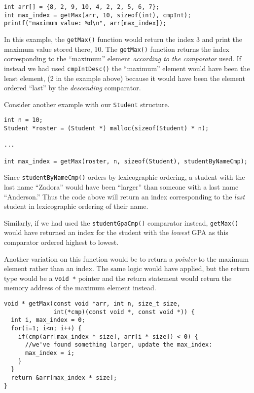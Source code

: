 \begin{verbatim}
int arr[] = {8, 2, 9, 10, 4, 2, 2, 5, 6, 7};
int max_index = getMax(arr, 10, sizeof(int), cmpInt);
printf("maximum value: %d\n", arr[max_index]);
\end{verbatim}

In this example, the \texttt{getMax()} function would return
the index 3 and print the maximum value stored there, 10.  The 
\texttt{getMax()} function returns the index corresponding to the
``maximum'' element \emph{according to the comparator} used.  If instead
we had used \texttt{cmpIntDesc()} the ``maximum'' element would have
been the least element, (2 in the example above) because it would have
been the element ordered ``last'' by the \emph{descending} comparator.

Consider another example with our \texttt{Student} structure.

\begin{verbatim}
int n = 10;
Student *roster = (Student *) malloc(sizeof(Student) * n);

...

int max_index = getMax(roster, n, sizeof(Student), studentByNameCmp);
\end{verbatim}

Since \texttt{studentByNameCmp()} orders by lexicographic ordering, 
a student with the last name ``Zadora'' would have been ``larger'' than 
someone with a last name ``Anderson.''  Thus the code above will return 
an index corresponding to the \emph{last} student in lexicographic ordering
of their name.

Similarly, if we had used the \texttt{studentGpaCmp()} comparator 
instead, \texttt{getMax()} would have returned an index for the
student with the \emph{lowest} GPA as this comparator ordered highest to
lowest.

Another variation on this function would be to return a \emph{pointer}
to the maximum element rather than an index.  The same logic would have
applied, but the return type would be a \texttt{void *} pointer
and the return statement would return the memory address of the maximum
element instead.

\begin{verbatim}
void * getMax(const void *arr, int n, size_t size, 
              int(*cmp)(const void *, const void *)) {
  int i, max_index = 0;
  for(i=1; i<n; i++) {
    if(cmp(arr[max_index * size], arr[i * size]) < 0) {
      //we've found something larger, update the max_index:
      max_index = i;
    }
  }
  return &arr[max_index * size];
}
\end{verbatim}

